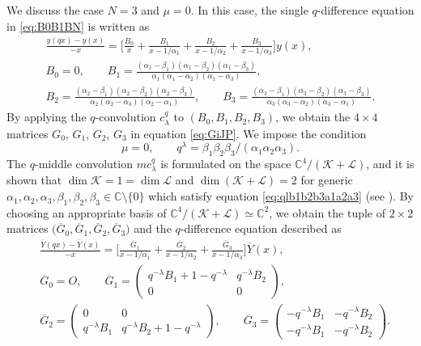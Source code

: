 \documentclass[pdftex]{sigma}
\numberwithin{equation}{section}
\theoremstyle{definition}
\begin{document}
We discuss the case $N=3 $ and $\mu =0 $.
In this case, the single $q$-difference equation in \eqref{eq:B0B1BN} is written as
\begin{gather}
\frac{y(qx) - y(x)}{-x} = \bigg[ \frac{B_0}{x} + \frac{B_1}{x-1/\alpha_1} + \frac{B_2}{x-1/\alpha_2} + \frac{B_3}{x-1/\alpha_3} \bigg] y(x), \nonumber\\
 B_0= 0, \qquad B_1= \frac{(\alpha_1-\beta_1)(\alpha_1-\beta_2)(\alpha_1-\beta_3)}{\alpha_1(\alpha_1-\alpha_2)(\alpha_1-\alpha_3)}, \nonumber \\
 B_2= \frac{(\alpha_2-\beta_1)(\alpha_2-\beta_2)(\alpha_2-\beta_3)}{\alpha_2(\alpha_2-\alpha_3)(\alpha_2-\alpha_1)}, \qquad B_3= \frac{(\alpha_3-\beta_1)(\alpha_3-\beta_2)(\alpha_3-\beta_3)}{\alpha_3(\alpha_3-\alpha_2)(\alpha_3-\alpha_1)}. \label{eq:B1B2B3}
\end{gather}
By applying the $q$-convolution $c^q_{\lambda}$ to $(B_0, B_1, B_2 ,B_3)$, we obtain the $4\times 4$ matrices $G_0$, $G_1$, $G_2$, $G_3$ in equation \eqref{eq:GiJP}.
We impose the condition
\begin{equation}
\mu=0, \qquad q^{\lambda}=\beta_1\beta_2\beta_3/(\alpha_1\alpha_2\alpha_3).
\label{eq:qlb1b2b3a1a2a3}
\end{equation}
The $q$-middle convolution $mc^q_{\lambda}$ is formulated on the space $\mathbb{C} ^4/ ( \mathcal{K} + \mathcal{L} )$, and it is shown that $\dim \mathcal{K} =1= \dim \mathcal{L} $ and $\dim ( \mathcal{K} + \mathcal{L} ) =2$ for generic $\alpha_1, \alpha_2, \alpha_3, \beta_1, \beta_2, \beta_3 \in \mathbb{C} \setminus \{0\}$ which satisfy equation \eqref{eq:qlb1b2b3a1a2a3} (see \cite{AT}).
By choosing an appropriate basis of $\mathbb{C} ^4/ ( \mathcal{K} + \mathcal{L} ) \simeq \mathbb{C} ^2$, we obtain the tuple of $2\times 2$ matrices $\bigl(\overline{G}_0, \overline{G}_1, \overline{G}_2 , \overline{G}_3 \bigr)$ and the $q$-difference equation described as
\begin{align}
&\frac{\overline{Y}(qx) - \overline{Y}(x)}{-x} = \bigg[ \frac{\overline{G}_1}{x-1/\alpha_1} + \frac{\overline{G}_2}{x-1/\alpha_2} + \frac{\overline{G}_3}{x-1/\alpha_3} \bigg] \overline{Y}(x), \nonumber \\
& \overline{G}_0=O, \qquad \overline{G}_1= \begin{pmatrix}
 q^{-\lambda}B_1 + 1 -q^{-\lambda} & q^{-\lambda}B_2 \\
 0 & 0
 \end{pmatrix}, \nonumber \\
& \overline{G}_2= \begin{pmatrix}
 0 & 0 \\
 q^{-\lambda}B_1 & q^{-\lambda}B_2 + 1 -q^{-\lambda}
 \end{pmatrix}, \qquad \overline{G}_3= \begin{pmatrix}
 -q^{-\lambda}B_1 & -q^{-\lambda}B_2 \\
 -q^{-\lambda}B_1 & -q^{-\lambda}B_2
 \end{pmatrix}.\label{eq:v-qhg-deg3}
\end{align}
\end{document}
